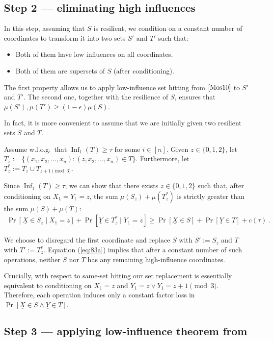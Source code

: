 \documentclass{daj}
\newcommand{\1}{\mathbbm{1}}
\theoremstyle{plain}
\theoremstyle{definition}
\DeclareMathOperator{\Inf}{Inf}
\begin{document}
\subsection{Step 2 --- eliminating high influences}

In this step, assuming that $S$ is resilient, we condition on a constant
number of coordinates to transform it into two
sets $S'$ and $T'$ such that:
\begin{itemize}
\item Both of them have low influences on all coordinates.
\item Both of them are supersets of $S$ (after conditioning).
\end{itemize}

The first property allows us to apply low-influence set hitting 
from $\cite{Mos10}$ to
$S'$ and $T'$. The second one, together with the resilience of $S$, 
ensures that $\mu(S'), \mu(T') \ge (1-\epsilon)\mu(S)$.

In fact, it is more convenient to assume that we are initially
given two resilient sets $S$ and $T$.

Assume w.l.o.g.~that $\Inf_1(T) \ge \tau$ for some $i \in [n]$.
Given $z \in \{0, 1, 2\}$, let 
$T_z := \{(x_1, x_2, \ldots, x_n): (z, x_2, \ldots, x_n) \in T\}$.
Furthermore, let $T^*_z := T_z \cup T_{z+1 \pmod 3}$.

Since $\Inf_1(T) \ge \tau$, we can show that
there exists $z \in \{0,1,2\}$ such that, after conditioning on
$X_1 = Y_1 = z$,
the sum $\mu(S_z)+ \mu(T^*_z)$ is strictly greater than
the sum $\mu(S) + \mu(T)$:
\begin{align}
\label{eq:83a}
  \Pr[\underline{X} \in S_z \mid X_1 = z] + 
  \Pr[\underline{Y} \in T^*_z \mid Y_1 = z]
  \ge \Pr[\underline{X} \in S] + \Pr[\underline{Y} \in T] + c(\tau) \; .
\end{align}

We choose to disregard the first coordinate and replace
$S$ with $S' := S_z$ and $T$ with $T' := T^*_{z}$.
Equation (\ref{eq:83a}) implies that after a constant number of such 
operations, neither $S$ nor $T$ has any remaining high-influence coordinates. 

Crucially, with respect to same-set hitting our set replacement
is essentially equivalent to conditioning on
$X_1 = z$ and $Y_1 = z \lor Y_1 = z + 1 \pmod 3$.
Therefore, each operation induces only a constant factor loss in 
$\Pr[\underline{X} \in S \land \underline{Y} \in T]$.

\subsection{Step 3 --- applying low-influence theorem from 
\texorpdfstring{\cite{Mos10}}{[Mos10]}}
\end{document}
